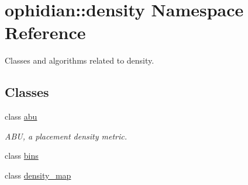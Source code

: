 \hypertarget{namespaceophidian_1_1density}{\section{ophidian\-:\-:density Namespace Reference}
\label{namespaceophidian_1_1density}
}


Classes and algorithms related to density.  


\subsection*{Classes}
\begin{DoxyCompactItemize}
\item 
class \hyperlink{classophidian_1_1density_1_1abu}{abu}
\begin{DoxyCompactList}\small\item\em A\-B\-U, a placement density metric. \end{DoxyCompactList}\item 
class \hyperlink{classophidian_1_1density_1_1bins}{bins}
\item 
class \hyperlink{classophidian_1_1density_1_1density__map}{density\-\_\-map}
\end{DoxyCompactItemize}
